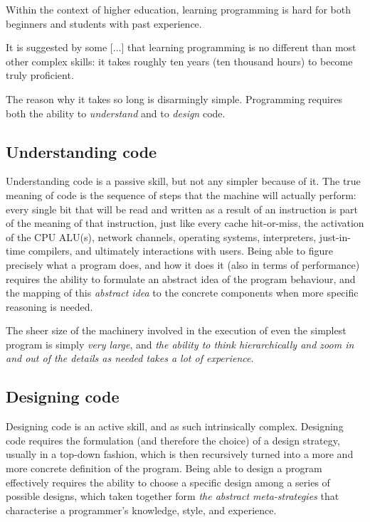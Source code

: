 Within the context of higher education, learning programming is hard for both beginners and students with past experience. 

It is suggested by some [...] that learning programming is no different than most other complex skills: it takes roughly ten years (ten thousand hours) to become truly proficient.

The reason why it takes so long is disarmingly simple. Programming requires both the ability to \textit{understand} and to \textit{design} code. 

\subsection{Understanding code}
Understanding code is a passive skill, but not any simpler because of it. The true meaning of code is the sequence of steps that the machine will actually perform: every single bit that will be read and written as a result of an instruction is part of the meaning of that instruction, just like every cache hit-or-miss, the activation of the CPU ALU(s), network channels, operating systems, interpreters, just-in-time compilers, and ultimately interactions with users. Being able to figure precisely what a program does, and how it does it (also in terms of performance) requires the ability to formulate an abstract idea of the program behaviour, and the mapping of this \textit{abstract idea} to the concrete components when more specific reasoning is needed.

The sheer size of the machinery involved in the execution of even the simplest program is simply \textit{very large}, and \textit{the ability to think hierarchically and zoom in and out of the details as needed takes a lot of experience}.

\subsection{Designing code}
Designing code is an active skill, and as such intrinsically complex. Designing code requires the formulation (and therefore the choice) of a design strategy, usually in a top-down fashion, which is then recursively turned into a more and more concrete definition of the program. Being able to design a program effectively requires the ability to choose a specific design among a series of possible designs, which taken together form \textit{the abstract meta-strategies} that characterise a programmer’s knowledge, style, and experience.

